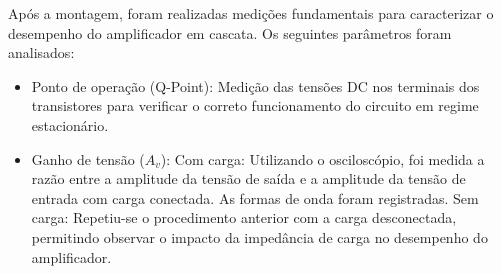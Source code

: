 Após a montagem, foram realizadas medições fundamentais para caracterizar o desempenho do amplificador em cascata. Os seguintes parâmetros foram analisados:

\begin{itemize} 
    \item Ponto de operação (Q-Point): Medição das tensões DC nos terminais dos transistores para verificar o correto funcionamento do circuito em regime estacionário.
    \item Ganho de tensão ($A_v$):
    \subitem Com carga: Utilizando o osciloscópio, foi medida a razão entre a amplitude da tensão de saída e a amplitude da tensão de entrada com carga conectada. As formas de onda foram registradas.
    \subitem Sem carga: Repetiu-se o procedimento anterior com a carga desconectada, permitindo observar o impacto da impedância de carga no desempenho do amplificador.
\end{itemize}
